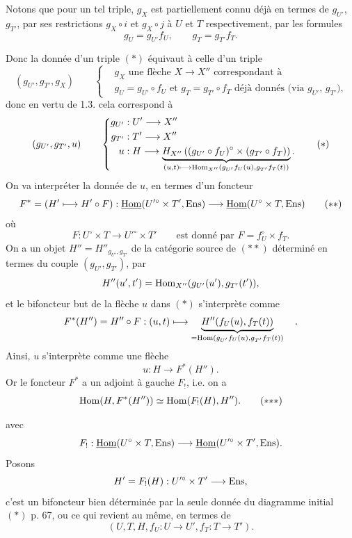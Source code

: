 Notons que pour un tel triple, $g_X$ est partiellement connu déjà en termes de $g_{U'}$, $g_{T'}$, par ses restrictions $g_X\circ i$ et $g_X\circ j$ à $U$ et $T$ respectivement, par les formules
\[
g_U = g_{U'}f_U, \qquad g_T = g_{T'}f_T.
\]

 Donc la donnée d'un triple $(*)$ équivaut à celle d'un triple
\[
(g_{U'}, g_{T'}, g_X) \qquad
\left\{\begin{aligned}
&g_X \text{ une flèche } X\longrightarrow X'' \text{ correspondant à}\\
&g_U = g_{U'}\circ f_U \text{ et } g_T = g_{T'}\circ f_T \text{ déjà donnés (via } g_{U'}\text{, } g_{T'}\text{),}
\end{aligned}\right.
\]
donc en vertu de 1.3. cela correspond à
\[
(g_{U'}, g_{T'}, u) \qquad
\left\{\begin{aligned}
g_{U'} &: U' \longrightarrow X''\\
g_{T'} &: T' \longrightarrow X''\\
u &: H \longrightarrow \underbrace{H_{X''}\left((g_{U'}\circ f_U)^{\circ}\times(g_{T'}\circ f_T)\right)}_{(u,t)\longmapsto \Hom_{X''}(g_{U'}f_U(u),g_{T'}f_T(t))}.
\end{aligned}\right.
\tag*{$(*)$}
\]
On va interpréter la donnée de $u$, en termes d'un foncteur
\[
F^{*} = (H'\longmapsto H'\circ F) : \uHom(U'^{\circ}\times T',\Ens) \longrightarrow \uHom(U^{\circ}\times T,\Ens)
\tag*{$(**)$}
\]
où
\[
F : U^{\circ}\times T \longrightarrow U'^{\circ}\times T' \qquad \text{est donné par } F = f_U^{\circ}\times f_T.
\]
On a un objet $H''=H''_{g_{U'},g_{T'}}$ de la catégorie source de $(**)$ déterminé en termes du couple $(g_{U'},g_{T'})$, par
\[
H''(u',t') = \mathrm{Hom}_{X''}(g_{U'}(u'),g_{T'}(t')),
\]
et le bifoncteur but de la flèche $u$ dans $(*)$ s'interprète comme
\[
F^{*}(H'') = H''\circ F : (u,t)\longmapsto \underbrace{H''(f_U(u),f_T(t))}_{=\mathrm{Hom}(g_{U'}f_U(u),g_{T'}f_T(t))} \quad .
\]
Ainsi, $u$ s'interprète comme une flèche
\[
u : H \longrightarrow F^{*}(H'').
\]
Or le foncteur $F^{*}$ a un adjoint à gauche $F_{!}$, i.e. on a
\[
\Hom(H,F^{*}(H'')) \simeq \Hom(F_{!}(H),H'').
\tag*{$(*{*}*)$}
\]

 avec
\[
F_{!} : \underline{\mathrm{Hom}}(U^{\circ}\times T,\mathrm{Ens}) \longrightarrow \underline{\mathrm{Hom}}(U'^{\circ}\times T',\mathrm{Ens}).
\]
Posons
\[
H' = F_{!}(H) : U'^{\circ}\times T' \longrightarrow \mathrm{Ens},
\]
c'est un bifoncteur bien déterminée par la seule donnée du diagramme initial $(*)$ p. 67, ou ce qui revient au même, en termes de %
\[
(U,T,H,f_U : U\longrightarrow U', f_T : T\longrightarrow T').
\]

